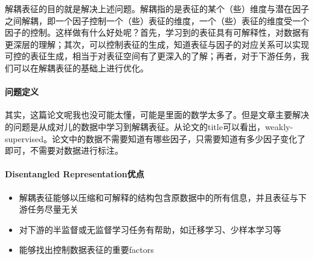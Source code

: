 解耦表征的目的就是解决上述问题。解耦指的是表征的某个（些）维度与潜在因子之间解耦，即一个因子控制一个（些）表征的维度，一个（些）表征的维度受一个因子的控制。这样做有什么好处呢？首先，学习到的表征具有可解释性，对数据有更深层的理解；其次，可以控制表征的生成，知道表征与因子的对应关系可以实现可控的表征生成，相当于对表征空间有了更深入的了解；再者，对于下游任务，我们可以在解耦表征的基础上进行优化。

\paragraph{问题定义}其实，这篇论文呢我也没可能太懂，可能是里面的数学太多了。但是文章主要解决的问题是从成对儿的数据中学习到解耦表征。从论文的title可以看出，weakly-supervised。论文中的数据不需要知道有哪些因子，只需要知道有多少因子变化了即可，不需要对数据进行标注。

\paragraph{Disentangled Representation优点}
\begin{itemize}
	\item 解耦表征能够以压缩和可解释的结构包含原数据中的所有信息，并且表征与下游任务尽量无关
	\item 对下游的半监督或无监督学习任务有帮助，如迁移学习、少样本学习等
	\item 能够找出控制数据表征的重要factors

\end{itemize}




